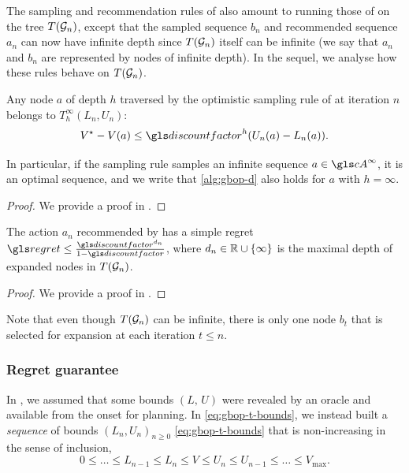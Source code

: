 The sampling and recommendation rules of \GBOPD also amount to running those of \OPD on the tree $T(\mathcal{G}_n)$, except that the sampled sequence $b_n$ and recommended sequence $a_n$ can now have infinite depth since $T(\mathcal{G}_n)$ itself can be infinite (we say that $a_n$ and $b_n$ are represented by nodes of infinite depth). In the sequel, we analyse how these rules behave on $T(\mathcal{G}_n)$.

\begin{lemma}[Expansion]
	\begin{leftbar}[lemmabar]
	\label{lem:expansion-bound}
	Any node $a$ of depth $h$ traversed by the optimistic sampling rule of \GBOPD at iteration $n$ belongs to $T_h^\infty(L_n, U_n)$: 
	\begin{equation}
	\label{eq:expansion-regret}
	V^\star-V(a) \leq \discount^h(U_n(a)-L_n(a)).
	\end{equation}
	
	In particular, if the sampling rule samples an infinite sequence $a\in \cA^\infty$, it is an optimal sequence, and we write that \eqref{alg:gbop-d} also holds for $a$ with $h=\infty$.
	\end{leftbar}
\end{lemma}
\begin{proof}
	We provide a proof in .
\end{proof}

\begin{lemma}[Recommendation]
	\begin{leftbar}[lemmabar]
	\label{lem:recommendation-bound}
	The action $a_n$ recommended by \GBOPD has a simple regret $\regret \leq \frac{\discount^{d_n}}{1-\discount}$, where $d_n\in\mathbb{R}\cup\{\infty\}$ is the maximal depth of expanded nodes in $T(\mathcal{G}_n)$.
	\end{leftbar}
\end{lemma}
\begin{proof}
	We provide a proof in .
\end{proof}
Note that even though $T(\mathcal{G}_n)$ can be infinite, there is only one node $b_t$ that is selected for expansion at each iteration $t\leq n$.

\subsubsection{Regret guarantee}

In , we assumed that some bounds $(L,\,U)$ were revealed by an oracle and available from the onset for planning. In \eqref{eq:gbop-t-bounds}, we instead built a \emph{sequence} of bounds $(L_n,U_n)_{n\geq 0}$ \eqref{eq:gbop-t-bounds} that is non-increasing in the sense of inclusion, \ie $$0\leq \dots\leq L_{n-1}\leq L_n\leq V\leq U_n\leq U_{n-1}\leq \dots\leq V_{\max}.$$

